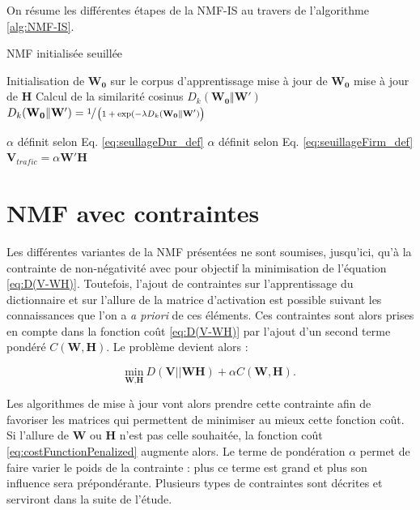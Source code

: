 On résume les différentes étapes de la NMF-IS au travers de l'algorithme \ref{alg:NMF-IS}.

\begin{algorithm}
\caption{NMF initialisée seuillée}
\begin{algorithmic}
\STATE Initialisation de $\mathbf{W_0}$ sur le corpus d'apprentissage
	\STATE mise à jour de $\mathbf{W_0}$
	\STATE mise à jour de $\mathbf{H}$
\ENDFOR
\STATE Calcul de la similarité cosinus $D_{k}(\mathbf{W_0} \Vert \mathbf{W'})$
	\STATE $D_{k}(\mathbf{W_0} \Vert \mathbf{W'}) = \sfrac{1}{\left(1+\exp({-\lambda D_{k}(\mathbf{W_0} \Vert \mathbf{W'})}\right)}$
\ENDIF

	\STATE $\alpha$ définit selon Eq. \ref{eq:seullageDur_def}
	\STATE $\alpha$ définit selon Eq. \ref{eq:seuillageFirm_def}
\ENDIF
\STATE $\mathbf{V}_{trafic} = \alpha \mathbf{W'H}$
\end{algorithmic}
\label{alg:NMF-IS}
\end{algorithm}


\section{NMF avec contraintes}\label{part:NMF_contrainte}
Les différentes variantes de la NMF présentées ne sont soumises, jusqu'ici, qu'à la contrainte de non-négativité avec pour objectif la minimisation de l'équation \ref{eq:D(V-WH)}. Toutefois, l'ajout de contraintes sur l'apprentissage du dictionnaire et sur l'allure de la matrice d'activation est possible suivant les connaissances que l'on a \textit{a priori} de ces éléments. Ces contraintes sont alors prises en compte dans la fonction coût \ref{eq:D(V-WH)} par l'ajout d'un second terme pondéré $C(\mathbf{W},\mathbf{H})$. Le problème devient alors :

\begin{equation}\label{eq:costFunctionPenalized}
\underset{\textbf{W},\textbf{H}}{\text{min}}~D\left(\textbf{V} \vert\vert \textbf{WH}\right) + \alpha C(\mathbf{W},\mathbf{H}).
\end{equation}

Les algorithmes de mise à jour vont alors prendre cette contrainte afin de favoriser les matrices qui permettent de minimiser au mieux cette fonction coût. Si l'allure de $\mathbf{W}$ ou $\mathbf{H}$ n'est pas celle souhaitée, la fonction coût \ref{eq:costFunctionPenalized} augmente alors. Le terme de pondération $\alpha$ permet de faire varier le poids de la contrainte : plus ce terme est grand et plus son influence sera prépondérante. Plusieurs types de contraintes sont décrites et serviront dans la suite de l'étude.

